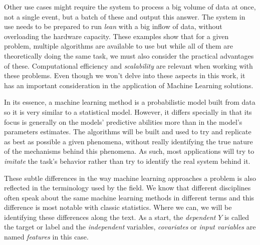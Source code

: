 Other use cases might require the system to process a big volume of data at once, not a single event, but a batch of these and output this answer. The system in use needs to be prepared to run \textit{lean} with a big inflow of data, without overloading the hardware capacity.  These examples show that for a given problem, multiple algorithms are available to use but while all of them are theoretically doing the same task, we must also consider the practical advantages of these. Computational efficiency and \textit{scalability} are relevant when working with these problems. Even though we won't delve into these aspects in this work, it has an important consideration in the application of Machine Learning solutions.


In its essence, a machine learning method is a probabilistic model built from data so it is very similar to a statistical model. However, it differs specially in that its focus is generally on the models' predictive abilities more than in the model's parameters estimates.\cite{breiman-statisticalmodeling} The algorithms will be built and used to try and replicate as best as possible a given phenomena, without really identifying the true nature of the mechanisms behind this phenomena. As such, most applications will try to \textit{imitate} the task's behavior rather than try to identify the real system behind it.


These subtle differences in the way machine learning approaches a problem is also reflected in the terminology used by the field. We know that different disciplines often speak about the same machine learning methods in different terms and this difference is most notable with classic statistics. Where we can, we will be identifying these differences along the text. As a start, the \textit{dependent} $Y$ is called the target or label and the \textit{independent} variables, \textit{covariates} or \textit{input variables} are named \textit{features} in this case. 
